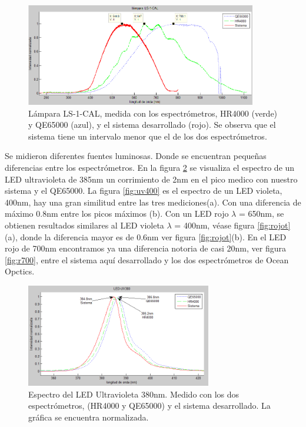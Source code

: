 \begin{figure}[h]
	\centering
	\includegraphics[width=0.9\linewidth,height=4.5cm]{Imagenes/4/ls_t}
	\caption[Espectro de la lámpara LS-1-CAL]{Lámpara LS-1-CAL, medida con los espectrómetros, HR4000 (verde) y QE65000 (azul), y el sistema desarrollado (rojo). Se observa que el sistema tiene un intervalo menor que el de los dos espectrómetros.}
	\label{fig:lst}
\end{figure}

Se midieron diferentes fuentes luminosas. Donde se encuentran pequeñas diferencias entre los espectrómetros. En la figura \ref{fig:uv380t} se visualiza el espectro de un LED ultravioleta de 385nm un corrimiento de 2nm en el pico medico con nuestro sistema y el QE65000. La figura \ref{fig:uv400} es el espectro de un LED violeta, 400nm, hay una gran similitud entre las tres mediciones(a). Con una diferencia de máximo 0.8nm entre los picos máximos (b). Con un LED rojo $\lambda$ = 650nm, se obtienen resultados similares al LED violeta $\lambda$ = 400nm, véase figura \ref{fig:rojot}(a), donde la diferencia mayor es de 0.6nm ver figura \ref{fig:rojot}(b). En el LED rojo de 700nm encontramos ya una diferencia notoria de casi 20nm, ver figura \ref{fig:r700}, entre el sistema aquí desarrollado y los dos espectrómetros de Ocean Opctics. 
\begin{figure}[h]
	\centering
	\includegraphics[width=0.9\linewidth,height=4.5cm]{Imagenes/4/uv380t}
	\caption[Espectro del LED Ultravioleta 380nm]{Espectro del LED Ultravioleta 380nm. Medido con los dos espectrómetros, (HR4000 y QE65000) y el sistema desarrollado. La gráfica se encuentra normalizada.}
	\label{fig:uv380t}
\end{figure}

